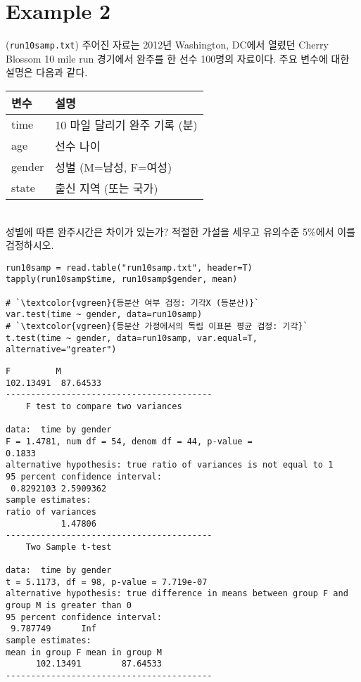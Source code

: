 \documentclass{article}
\begin{document}
\section*{Example 2}
(\texttt{run10samp.txt}) 주어진 자료는 2012년 Washington, DC에서 열렸던 Cherry Blossom 10 mile run 경기에서 완주를 한 선수 100명의 자료이다. 주요 변수에 대한 설명은 다음과 같다.
\begin{table}[htb!]
\centering
\begin{tabular}{ |p{3cm}|p{6cm}|  }
 \hline
 변수 & 설명\\
 \hline
time & 10 마일 달리기 완주 기록 (분)\\
age  & 선수 나이\\
gender & 성별 (M=남성, F=여성)\\
state &  출신 지역 (또는 국가)\\
 \hline
\end{tabular}
\end{table} \\
성별에 따른 완주시간은 차이가 있는가? 적절한 가설을 세우고 유의수준 5\%에서 이를 검정하시오.
\begin{lstlisting}[style={r-style}]
run10samp = read.table("run10samp.txt", header=T)
tapply(run10samp$time, run10samp$gender, mean)

# `\textcolor{vgreen}{등분산 여부 검정: 기각X (등분산)}`
var.test(time ~ gender, data=run10samp)
# `\textcolor{vgreen}{등분산 가정에서의 독립 이표본 평균 검정: 기각}`
t.test(time ~ gender, data=run10samp, var.equal=T, alternative="greater")

\end{lstlisting}
\begin{lstlisting}[style={out-style}]
        F         M 
102.13491  87.64533
-----------------------------------------
	F test to compare two variances

data:  time by gender
F = 1.4781, num df = 54, denom df = 44, p-value =
0.1833
alternative hypothesis: true ratio of variances is not equal to 1
95 percent confidence interval:
 0.8292103 2.5909362
sample estimates:
ratio of variances 
           1.47806 
-----------------------------------------
	Two Sample t-test

data:  time by gender
t = 5.1173, df = 98, p-value = 7.719e-07
alternative hypothesis: true difference in means between group F and group M is greater than 0
95 percent confidence interval:
 9.787749      Inf
sample estimates:
mean in group F mean in group M 
      102.13491        87.64533 
-----------------------------------------
\end{lstlisting}
\end{document}
